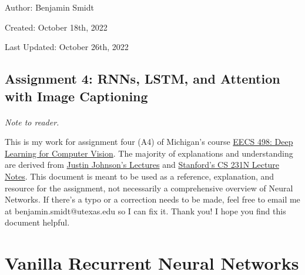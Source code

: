\documentclass[12pt]{article}
\begin{document}
\noindent Author: Benjamin Smidt

\noindent Created: October 18th, 2022

\noindent Last Updated: October 26th, 2022
\begin{center}
\section*{Assignment 4: RNNs, LSTM, and Attention with Image Captioning}
\end{center}

\paragraph{} \emph{Note to reader.} 

This is my work for assignment four (A4) of Michigan's course
\href{https://web.eecs.umich.edu/~justincj/teaching/eecs498/WI2022/}
{EECS 498: Deep Learning for Computer Vision}. The majority of explanations and understanding are 
derived from \href{https://www.youtube.com/watch?v=dJYGatp4SvA&list=PL5-TkQAfAZFbzxjBHtzdVCWE0Zbhomg7r&index=1}
{Justin Johnson's Lectures} and \href{http://cs231n.stanford.edu/schedule.html}{Stanford's CS 231N Lecture Notes}.
This document is meant to be used as a reference, 
explanation, and resource for the assignment, not necessarily a comprehensive overview
of Neural Networks. If there's a typo or a correction needs to be made, feel free to 
email me at benjamin.smidt@utexas.edu so I can fix it. Thank you! I hope you find this 
document helpful.

\tableofcontents{}

\newpage

\section{Vanilla Recurrent Neural Networks}
\end{document}

